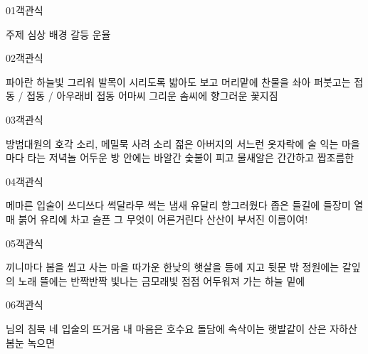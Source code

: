 \documentclass[fs9,seriesFre]{korfarm-base}
\begin{document}
\par\medskip
\kfBeginMC
\begin{kfQBlock}{01}{객관식}
\begin{kfChoices}
\kfChoice 주제
\kfChoice 심상
\kfChoice 배경
\kfChoice 갈등
\kfChoice 운율
\end{kfChoices}
\end{kfQBlock}
\begin{kfQBlock}{02}{객관식}
\begin{kfChoices}
\kfChoice 파아란 하늘빛 그리워
\kfChoice 발목이 시리도록 밟아도 보고
\kfChoice 머리맡에 찬물을 솨아 퍼붓고는
\kfChoice 접동 / 접동 / 아우래비 접동
\kfChoice 어마씨 그리운 솜씨에 향그러운 꽃지짐
\end{kfChoices}
\end{kfQBlock}
\begin{kfQBlock}{03}{객관식}
\begin{kfChoices}
\kfChoice 방범대원의 호각 소리, 메밀묵 사려 소리
\kfChoice 젊은 아버지의 서느런 옷자락에
\kfChoice 술 익는 마을마다 타는 저녁놀
\kfChoice 어두운 방 안에는 바알간 숯불이 피고
\kfChoice 물새알은 간간하고 짭조름한
\end{kfChoices}
\end{kfQBlock}
\begin{kfQBlock}{04}{객관식}
\begin{kfChoices}
\kfChoice 메마른 입술이 쓰디쓰다
\kfChoice 썩달라무 썩는 냄새 유달리 향그러웠다
\kfChoice 좁은 들길에 들장미 열매 붉어
\kfChoice 유리에 차고 슬픈 그 무엇이 어른거린다
\kfChoice 산산이 부서진 이름이여!
\end{kfChoices}
\end{kfQBlock}
\begin{kfQBlock}{05}{객관식}
\begin{kfChoices}
\kfChoice 끼니마다 봄을 씹고 사는 마을
\kfChoice 따가운 한낮의 햇살을 등에 지고
\kfChoice 뒷문 밖 정원에는 갈잎의 노래
\kfChoice 뜰에는 반짝반짝 빛나는 금모래빛
\kfChoice 점점 어두워져 가는 하늘 밑에
\end{kfChoices}
\end{kfQBlock}
\begin{kfQBlock}{06}{객관식}
\begin{kfChoices}
\kfChoice 님의 침묵
\kfChoice 네 입술의 뜨거움
\kfChoice 내 마음은 호수요
\kfChoice 돌담에 속삭이는 햇발같이
\kfChoice 산은 자하산 봄눈 녹으면
\end{kfChoices}
\end{kfQBlock}
\end{document}
